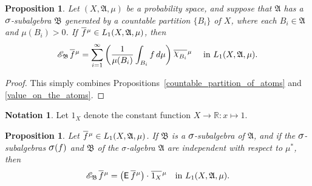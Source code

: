 \documentclass[
twoside=true,
paper=letter,
fontsize=9pt,
pagesize=auto,
leqno,
openany,
headsepline,
overfullrule,
]{scrbook}
\theoremstyle{plain}
\theoremstyle{plain}
\newtheorem{prop}[thm]{Proposition}
\theoremstyle{definition}
\newtheorem{notn}[thm]{Notation}
\theoremstyle{bfnoteitalic}
\theoremstyle{bfnoteroman}
\newcommand{\sigalg}[1]{\mathfrak{#1}}
\newcommand{\cali}[1]{\mathscr{#1}}
\newcommand{\sfop}[1]{\mathsf{#1}}
\newcommand{\expval}{\sfop{E}\,}
\newcommand{\condexpsub}[2]
{\mathop{\cali{E}\hspace{-1.5pt}}\nolimits_{#2}\hspace{-1pt}#1}
\newcommand{\sagb}{\mathop{\hbox{\large{$\sigma$}}}\nolimits}
\newcommand{\textsigma}{\hbox{\large{$\sigma$}}\kern-1pt}
\newcommand{\charfunction}[1]{\mathop{{\raisebox{2pt}{$\chi$}}_{#1}}}
\newcommand{\R}{\mathbb{R}}
\newcommand{\sigmaalgebra}{\sigalg{A}}
\newcommand{\sigmaalgebraii}{\sigalg{B}}
\newcommand{\oneonomega}{1_\measurespace}
\newcommand{\sigalgb}{\sigmaalgebraii}
\newcommand{\function}{f}
\newcommand{\measurespace}{X}
\newcommand{\mspaceelt}{x}
\newcommand{\measure}{\mu}
\newcommand*\xbar[1]{%
   \hbox{%
     \vbox{%
       \hrule height 0.4pt %
       \kern0.4ex%
       \hbox{%
         \ensuremath{#1}%
       }%
     }%
   }%
}
\newcommand{\lebclass}[1]{\hspace{.5pt}\xbar{#1}\hspace{0.5pt}}
\newcommand{\ellclass}[2]{\lebclass{#1}^{#2}}
\begin{document}
\begin{prop}\label{conditional_expectation_countable}
Let $(\measurespace, \sigmaalgebra,\measure)$ be a probability space, and suppose that $\sigmaalgebra$ has a 
$\textsigma$-subalgebra $\sigmaalgebraii$ generated by a countable partition $\{B_i\}$ of $\measurespace$, where each $B_i\in\sigmaalgebra$ and $\measure(B_i)>0$. 
If $\ellclass{\function}{\measure} \in L_1(\measurespace, \sigmaalgebra,\measure)$, then
\[
\condexpsub{\ellclass{\function}{\measure}}{\sigalgb}
=
\sum_{i=1}^{\infty}
\left(
\frac{1}{\measure(B_i)}
\int_{B_i} \function\, d\measure
\right)
\ellclass{\charfunction{B_i}}{\measure}
\quad \text{ in $L_1(\measurespace, \sigmaalgebra,\measure)$.}
\]
\end{prop}

\begin{proof}
This simply combines Propositions~\ref{countable_partition_of_atoms} and \ref{value_on_the_atoms}.
\end{proof}



\begin{notn}
Let $\oneonomega$ denote the constant function $\measurespace\to\R:\mspaceelt\mapsto 1$.
\end{notn}




\begin{prop}\label{conditional_is_expected}
Let $\ellclass{\function}{\measure}\in L_1(\measurespace, \sigmaalgebra,\measure)$.
If $\sigmaalgebraii$ is a $\textsigma$-subalgebra of $\sigmaalgebra$, and if the 
$\textsigma$-subalgebras $\sagb(\function)$ and 
$\sigmaalgebraii$ of the \textsigma-algebra $\sigmaalgebra$ are independent with respect to $\measure^*$, then
\[
\condexpsub{\ellclass{\function}{\measure}}{\sigmaalgebraii}
=  
\bigl(\expval{\ellclass{\function}{\measure}}\bigr)
\cdot \ellclass{\oneonomega}{\measure}
\quad
\text{in $L_1(\measurespace, \sigmaalgebra,\measure)$.}
\]
\end{prop}
\end{document}
